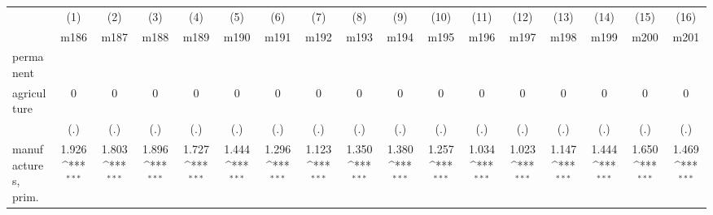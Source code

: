 {
\def\sym#1{\ifmmode^{#1}\else\(^{#1}\)\fi}
\begin{tabular}{l*{16}{c}}
\hline\hline
                    &\multicolumn{1}{c}{(1)}&\multicolumn{1}{c}{(2)}&\multicolumn{1}{c}{(3)}&\multicolumn{1}{c}{(4)}&\multicolumn{1}{c}{(5)}&\multicolumn{1}{c}{(6)}&\multicolumn{1}{c}{(7)}&\multicolumn{1}{c}{(8)}&\multicolumn{1}{c}{(9)}&\multicolumn{1}{c}{(10)}&\multicolumn{1}{c}{(11)}&\multicolumn{1}{c}{(12)}&\multicolumn{1}{c}{(13)}&\multicolumn{1}{c}{(14)}&\multicolumn{1}{c}{(15)}&\multicolumn{1}{c}{(16)}\\
                    &\multicolumn{1}{c}{m186}&\multicolumn{1}{c}{m187}&\multicolumn{1}{c}{m188}&\multicolumn{1}{c}{m189}&\multicolumn{1}{c}{m190}&\multicolumn{1}{c}{m191}&\multicolumn{1}{c}{m192}&\multicolumn{1}{c}{m193}&\multicolumn{1}{c}{m194}&\multicolumn{1}{c}{m195}&\multicolumn{1}{c}{m196}&\multicolumn{1}{c}{m197}&\multicolumn{1}{c}{m198}&\multicolumn{1}{c}{m199}&\multicolumn{1}{c}{m200}&\multicolumn{1}{c}{m201}\\
\hline
permanent           &                     &                     &                     &                     &                     &                     &                     &                     &                     &                     &                     &                     &                     &                     &                     &                     \\
agriculture         &           0         &           0         &           0         &           0         &           0         &           0         &           0         &           0         &           0         &           0         &           0         &           0         &           0         &           0         &           0         &           0         \\
                    &         (.)         &         (.)         &         (.)         &         (.)         &         (.)         &         (.)         &         (.)         &         (.)         &         (.)         &         (.)         &         (.)         &         (.)         &         (.)         &         (.)         &         (.)         &         (.)         \\
[1em]
manufactures, prim. &       1.926\sym{***}&       1.803\sym{***}&       1.896\sym{***}&       1.727\sym{***}&       1.444\sym{***}&       1.296\sym{***}&       1.123\sym{***}&       1.350\sym{***}&       1.380\sym{***}&       1.257\sym{***}&       1.034\sym{***}&       1.023\sym{***}&       1.147\sym{***}&       1.444\sym{***}&       1.650\sym{***}&       1.469\sym{***}\\

\end{tabular}}
